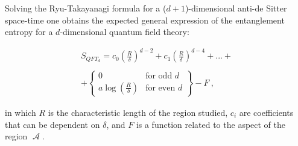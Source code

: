 \documentclass[lettersize,journal]{IEEEtran}
\providecommand{\eq}[2]{
    \begin{equation}
        #2
    \label{eq:#1}
    \end{equation}
}
\DeclareMathOperator{\calA}{\mathcal{A}}
\begin{document}
Solving the Ryu-Takayanagi formula for a ($d+1$)-dimensional anti-de Sitter space-time one obtains the expected general expression of the entanglement entropy for a $d$-dimensional quantum field theory:
\eq{EE}{
    \begin{array}{rr}
        {S_{QFT_d} = c_0 \left( \frac{R}{\delta} \right) ^{d-2} + c_1 \left( \frac{R}{\delta} \right) ^{d-4} + ... + } \\ \\
        {+ \left\{ \begin{array}{cl} 
        0 & \text{for odd } d \\
        a \log \left( \frac{R}{\delta} \right) & \text{for even } d
        \end{array} \right\}
        - F \ ,}
    \end{array}
}
\cite{nishioka_entanglement_2018} in which $R$ is the characteristic length of the region studied, $c_i$ are coefficients that can be dependent on $\delta$, and $F$ is a function related to the aspect of the region $\calA$.


\subsection{}


\printbibliography
\end{document}
